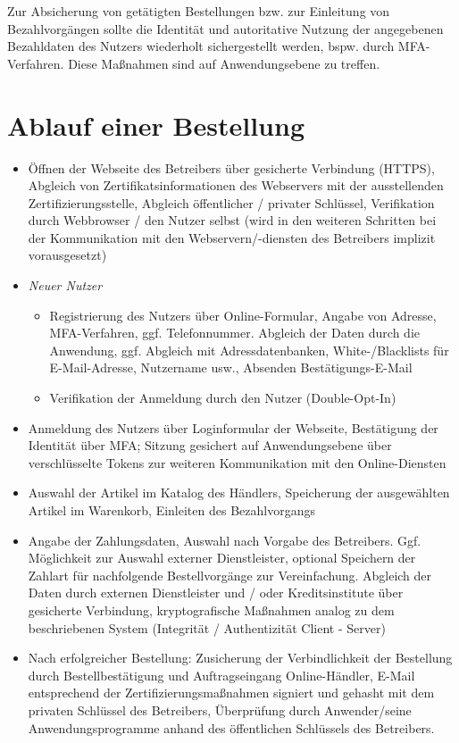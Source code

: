 \noindent
Zur Absicherung von getätigten Bestellungen bzw. zur Einleitung von Bezahlvorgängen sollte die Identität und autoritative Nutzung der angegebenen Bezahldaten des Nutzers wiederholt sichergestellt werden, bspw. durch MFA-Verfahren.
Diese Maßnahmen sind auf Anwendungsebene zu treffen.

\section{Ablauf einer Bestellung}

\begin{itemize}
    \itemsep0.5em
    \item Öffnen der Webseite des Betreibers über gesicherte Verbindung (HTTPS), Abgleich von Zertifikatsinformationen des Webservers mit der ausstellenden Zertifizierungsstelle, Abgleich öffentlicher / privater Schlüssel, Verifikation durch Webbrowser / den Nutzer selbst (wird in den weiteren Schritten bei der Kommunikation mit den Webservern/-diensten des Betreibers implizit vorausgesetzt)
    \item \textit{Neuer Nutzer}
    \begin{itemize}
        \item Registrierung des Nutzers über Online-Formular, Angabe von Adresse, MFA-Verfahren, ggf. Telefonnummer. Abgleich der Daten durch die Anwendung, ggf. Abgleich mit Adressdatenbanken, White-/Blacklists für E-Mail-Adresse, Nutzername usw., Absenden Bestätigungs-E-Mail
        \item Verifikation der Anmeldung durch den Nutzer (Double-Opt-In)
    \end{itemize}
    \item Anmeldung des Nutzers über Loginformular der Webseite, Bestätigung der Identität über MFA; Sitzung gesichert auf Anwendungsebene über verschlüsselte Tokens zur weiteren Kommunikation mit den Online-Diensten
    \item Auswahl der Artikel im Katalog des Händlers, Speicherung der ausgewählten Artikel im Warenkorb, Einleiten des Bezahlvorgangs
    \item Angabe der Zahlungsdaten, Auswahl nach Vorgabe des Betreibers. Ggf. Möglichkeit zur Auswahl externer Dienstleister, optional Speichern der Zahlart für nachfolgende Bestellvorgänge zur Vereinfachung. Abgleich der Daten durch externen Dienstleister und / oder Kreditsinstitute über gesicherte Verbindung, kryptografische Maßnahmen analog zu dem beschriebenen System (Integrität / Authentizität Client - Server)
    \item Nach erfolgreicher Bestellung: Zusicherung der Verbindlichkeit der Bestellung durch Bestellbestätigung und Auftragseingang Online-Händler, E-Mail entsprechend der Zertifizierungsmaßnahmen signiert und gehasht mit dem privaten Schlüssel des Betreibers, Überprüfung durch Anwender/seine Anwendungsprogramme anhand des öffentlichen Schlüssels des Betreibers.
\end{itemize}